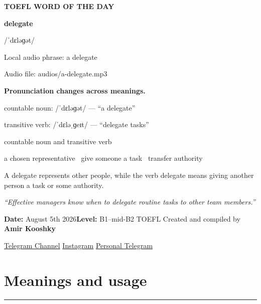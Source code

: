 \documentclass[11pt]{article}
\newcommand{\sectionrule}{\par\vspace{-0.5em}\noindent\textcolor{Accent}{\rule{\linewidth}{0.6pt}}\par}
\begin{document}
\begin{center}
{\sffamily\bfseries\color{Accent} TOEFL WORD OF THE DAY\par}
\vspace{8mm}
{\fontsize{42}{48}\selectfont\bfseries delegate\par}
\vspace{2mm}
{\Large\sffamily\color{Accent} /ˈdɛləɡət/\par}
\vspace{2mm}
{\small\sffamily Local audio phrase: a delegate\par}
{\small\sffamily Audio file: audios/a-delegate.mp3\par}
\vspace{3mm}
{\bfseries\color{Accent} Pronunciation changes across meanings.\par}
countable noun: /ˈdɛləɡət/ --- “a delegate”\par
transitive verb: /ˈdɛləˌɡeɪt/ --- “delegate tasks”\par
\vspace{2mm}
{\large\sffamily\color{Muted} countable noun and transitive verb\par}
\vspace{5mm}
{\sffamily a chosen representative \textbullet\ give someone a task \textbullet\ transfer authority\par}
\vspace{6mm}
{\large A delegate represents other people, while the verb delegate means giving another person a task or some authority.\par}
\vspace{6mm}
\begin{minipage}{0.84\textwidth}
\itshape “Effective managers know when to delegate routine tasks to other team members.”
\end{minipage}\par
\vspace{10mm}
\textbf{Date:} August 5th 2026\quad\textbullet\quad \textbf{Level:} B1--mid-B2 TOEFL
\vfill
Created and compiled by \textbf{Amir Kooshky}\par
\vspace{2mm}
\href{https://t.me/KooshkyTOEFL}{Telegram Channel}\quad\textbullet\quad
\href{https://www.instagram.com/kooshkytoefl}{Instagram}\quad\textbullet\quad
\href{https://t.me/KooshkyTOEFL\_pv}{Personal Telegram}
\end{center}
\newpage
\tableofcontents
\newpage

\section{Meanings and usage}
\sectionrule
\end{document}
